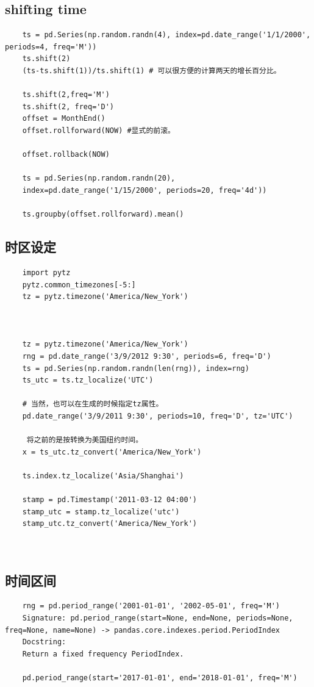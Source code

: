 \documentclass{article}
\begin{document}
\subsection{shifting time}

\begin{lstlisting}
	ts = pd.Series(np.random.randn(4), index=pd.date_range('1/1/2000', periods=4, freq='M'))
	ts.shift(2)
	(ts-ts.shift(1))/ts.shift(1) # 可以很方便的计算两天的增长百分比。
	
	ts.shift(2,freq='M')
	ts.shift(2, freq='D')
	offset = MonthEnd()
	offset.rollforward(NOW) #显式的前滚。
	
	offset.rollback(NOW)
	
	ts = pd.Series(np.random.randn(20),
	index=pd.date_range('1/15/2000', periods=20, freq='4d'))
	
	ts.groupby(offset.rollforward).mean()
\end{lstlisting}
\subsection{时区设定}
\begin{lstlisting}
	import pytz
	pytz.common_timezones[-5:]
	tz = pytz.timezone('America/New_York')
	
	
	
	tz = pytz.timezone('America/New_York')
	rng = pd.date_range('3/9/2012 9:30', periods=6, freq='D')
	ts = pd.Series(np.random.randn(len(rng)), index=rng)
	ts_utc = ts.tz_localize('UTC')
	
	# 当然，也可以在生成的时候指定tz属性。
	pd.date_range('3/9/2011 9:30', periods=10, freq='D', tz='UTC')
	
	 将之前的是按转换为美国纽约时间。
	x = ts_utc.tz_convert('America/New_York')
	
	ts.index.tz_localize('Asia/Shanghai')
	
	stamp = pd.Timestamp('2011-03-12 04:00')
	stamp_utc = stamp.tz_localize('utc')
	stamp_utc.tz_convert('America/New_York')
	
	
\end{lstlisting}

\subsection{时间区间}

\begin{lstlisting}
	rng = pd.period_range('2001-01-01', '2002-05-01', freq='M')
	Signature: pd.period_range(start=None, end=None, periods=None, freq=None, name=None) -> pandas.core.indexes.period.PeriodIndex
	Docstring:
	Return a fixed frequency PeriodIndex.
	
	pd.period_range(start='2017-01-01', end='2018-01-01', freq='M')
	
	
	
	
\end{lstlisting}
\end{document}
